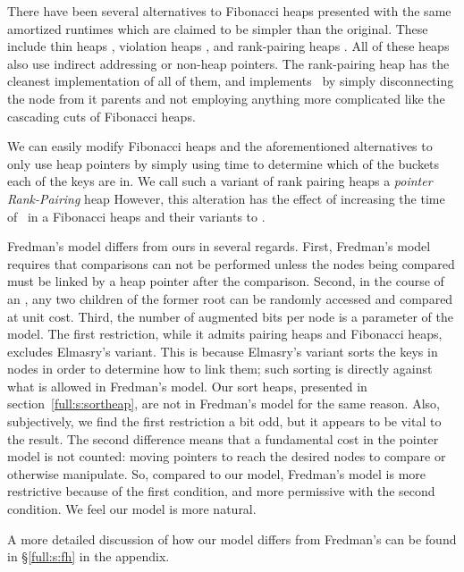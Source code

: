 There have been several alternatives to Fibonacci heaps presented with the same amortized runtimes which are claimed to be simpler than the original. These include
thin heaps \cite{DBLP:journals/talg/KaplanT08},
violation heaps \cite{DBLP:journals/dmaa/Elmasry10},
and rank-pairing heaps \cite{DBLP:journals/siamcomp/HaeuplerST11}.
All of these heaps also use indirect addressing or non-heap pointers. The rank-pairing heap has the cleanest implementation of all of them, and implements \opDc\ by simply disconnecting the node from it parents and not employing anything more complicated like the cascading cuts of Fibonacci heaps.

We can easily modify Fibonacci heaps and the aforementioned alternatives to only use heap pointers by simply 
using  time to determine which of the  buckets each of the  keys are in. We call such a variant of rank pairing heaps a \emph{pointer Rank-Pairing} heap However, this alteration has the effect of increasing the time of \opDc\ in a Fibonacci heaps and their variants to . 

Fredman's model differs from ours in several regards. First, Fredman's model requires that comparisons can not be performed unless the nodes being compared must be linked by a heap pointer after the comparison. Second, in the course of an \opEm, any two children of the former root can be randomly accessed and compared at unit cost. Third, the number of augmented bits per node is a parameter of the model. The first restriction, while it admits pairing heaps and Fibonacci heaps, excludes Elmasry's variant. This is because Elmasry's variant sorts the keys in nodes in order to determine how to link them; such sorting is directly against what is allowed in Fredman's model. Our sort heaps, presented in section~\ref{full:s:sortheap}, are not in Fredman's model for the same reason. Also, subjectively, we find the first restriction a bit odd, but it appears to be vital to the result. The second difference means that a fundamental cost in the pointer model is not counted: moving pointers to reach the desired nodes to compare or otherwise manipulate. So, compared to our model, Fredman's model is more restrictive because of the first condition, and more permissive with the second condition. We feel our model is more natural.
\begin{shortonly}
A more detailed discussion of how our model differs from Fredman's can be found in \S\ref{full:s:fh} in the appendix.
\end{shortonly}


